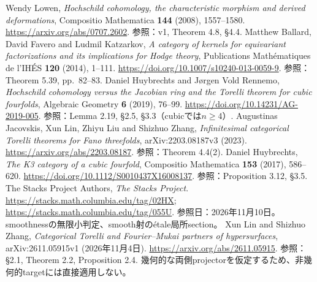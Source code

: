  Wendy Lowen,
\emph{Hochschild cohomology, the characteristic morphism and derived deformations},
Compositio Mathematica \textbf{144} (2008), 1557--1580.
\url{https://arxiv.org/abs/0707.2602}. 参照：v1, Theorem 4.8, \S4.4.
 Matthew Ballard, David Favero and Ludmil Katzarkov,
\emph{A category of kernels for equivariant factorizations and its implications for Hodge theory},
Publications Mathématiques de l'IHÉS \textbf{120} (2014), 1--111.
\url{https://doi.org/10.1007/s10240-013-0059-9}.
参照：Theorem 5.39, pp.~82--83.
 Daniel Huybrechts and Jørgen Vold Rennemo,
\emph{Hochschild cohomology versus the Jacobian ring and the Torelli theorem for cubic fourfolds},
Algebraic Geometry \textbf{6} (2019), 76--99.
\url{https://doi.org/10.14231/AG-2019-005}.
参照：Lemma 2.19, \S2.5, \S3.3（cubicでは$n\ge4$）.
 Augustinas Jacovskis, Xun Lin, Zhiyu Liu and Shizhuo Zhang,
\emph{Infinitesimal categorical Torelli theorems for Fano threefolds},
arXiv:2203.08187v3 (2023).
\url{https://arxiv.org/abs/2203.08187}. 参照：Theorem 4.4(2).
 Daniel Huybrechts, \emph{The K3 category of a cubic fourfold},
Compositio Mathematica \textbf{153} (2017), 586--620.
\url{https://doi.org/10.1112/S0010437X16008137}. 参照：Proposition 3.12, \S3.5.
 The Stacks Project Authors, \emph{The Stacks Project}.
\url{https://stacks.math.columbia.edu/tag/02HX};
\url{https://stacks.math.columbia.edu/tag/055U}.
参照日：2026年11月10日。smoothnessの無限小判定、smooth射のétale局所section。
 Xun Lin and Shizhuo Zhang,
\emph{Categorical Torelli and Fourier--Mukai partners of hypersurfaces},
arXiv:2611.05915v1 (2026年11月4日).
\url{https://arxiv.org/abs/2611.05915}.
参照：\S2.1, Theorem 2.2, Proposition 2.4.
幾何的な両側projectorを仮定するため、非幾何的targetには直接適用しない。
